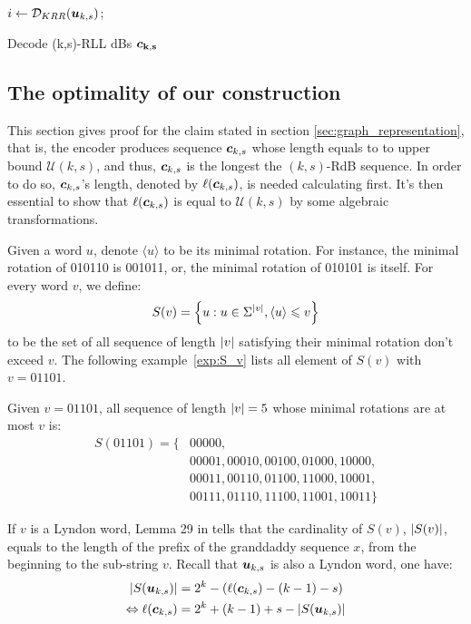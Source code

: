 \begin{algorithm}
\DontPrintSemicolon
    \BlankLine
    
    $i \gets {\cal D}_{KRR}({\boldsymbol u}_{k,s})$; \\
    \caption{Decode (k,s)-RLL dBs $\bf{\boldsymbol c}_{k,s}$}
    \label{alg:decode}
\end{algorithm}

\subsection{The optimality of our construction}
This section gives proof for the claim stated in section \ref{sec:graph_representation}, that is, the encoder produces sequence ${\boldsymbol c}_{k,s}$ whose length equals to to upper bound $\mathcal{U}(k,s)$, and thus, ${\boldsymbol c}_{k,s}$ is the longest the $(k,s)$-RdB sequence. In order to do so, ${\boldsymbol c}_{k,s}$'s length, denoted by $\ell({\boldsymbol c}_{k,s})$, is needed calculating first. It's then essential to show that $\ell({\boldsymbol c}_{k,s})$ is equal to $\mathcal{U}(k,s)$ by some algebraic transformations.

Given a word $u$, denote $\langle u\rangle$ to be its minimal rotation. For instance, the minimal rotation of 010110 is 001011, or, the minimal rotation of 010101 is itself. For every word $v$, we define:
\begin{align*}
    S(v) = \left\{u: u\in\Sigma^{\left \lvert  v \right \rvert},\langle u\rangle\leqslant v\right\}
\end{align*}
to be the set of all sequence of length $\left \lvert  v \right \rvert$ satisfying their minimal rotation don't exceed $v$. The following example~\ref{exp:S_v} lists all element of $S(v)$ with $v=01101$.
\begin{example}[Example of $S(v)$]\label{exp:S_v}
    Given $v= 01101$, all sequence of length $\left \lvert v \right \rvert=5$ whose minimal rotations are at most $v$ is:
    \begin{align*}
        S(01101) = \bigl\{ &00000,\\
        &00001,00010,00100,01000,10000, \\
        &00011,00110,01100,11000,10001, \\
        &00111,01110,11100,11001,10011 \bigl\}
    \end{align*}
\end{example}
If $v$ is a Lyndon word, Lemma 29 in \cite{kociumaka2016efficient} tells that the cardinality of $S(v)$, $\left \lvert  S(v) \right \rvert$, equals to the length of the prefix of the granddaddy sequence $x$, from the beginning to the sub-string $v$. Recall that ${\boldsymbol u}_{k,s}$ is also a Lyndon word, one have:
\begin{align}
    \left \lvert  S({\boldsymbol u}_{k,s}) \right \rvert &= 2^{k}- (\ell({\boldsymbol c}_{k,s}) - (k-1) -s ) \nonumber\\
    \Leftrightarrow  \ell({\boldsymbol c}_{k,s}) &= 2^{k}+(k-1)+s-\left \lvert  S({\boldsymbol u}_{k,s}) \right \rvert \label{eq:cks&sks}
\end{align}

